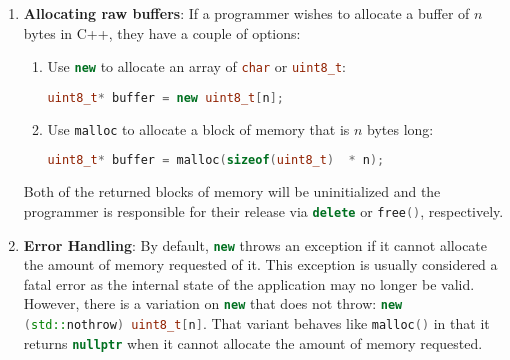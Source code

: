\documentclass[letterpaper, 11pt]{article}
\newcommand{\inlinecode}[1]{\colorbox{codegrey}{\lstinline[language=C++]{#1}}}
\begin{document}
\begin{enumerate}
  \item {\bfseries Allocating raw buffers}:
  If a programmer wishes to allocate a buffer of $n$ bytes in C++, they have a couple of options:
  \begin{enumerate}
   \item Use \inlinecode{new} to allocate an array of \inlinecode{char} or \inlinecode{uint8_t}:
   \begin{lstlisting}[language=C++]
   uint8_t* buffer = new uint8_t[n];
   \end{lstlisting}
   \item Use \inlinecode{malloc} to allocate a block of memory that is $n$ bytes long:
   \begin{lstlisting}[language=C++]
   uint8_t* buffer = malloc(sizeof(uint8_t)  * n);
   \end{lstlisting}
  \end{enumerate}
  Both of the returned blocks of memory will be uninitialized and the programmer is responsible
  for their release via \inlinecode{delete} or \inlinecode{free()}, respectively.
  
  \item {\bfseries Error Handling}:
  By default, \inlinecode{new} throws an exception if it cannot allocate the amount of memory
  requested of it. This exception is usually considered a fatal error as the internal state of
  the application may no longer be valid. However, there is a variation on \inlinecode{new} that
  does not throw: \inlinecode{new (std::nothrow) uint8_t[n]}. That variant behaves like \inlinecode{malloc()}
  in that it returns \inlinecode{nullptr} when it cannot allocate the amount of memory requested.


\end{enumerate}
\end{document}
